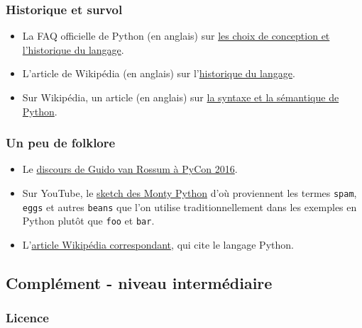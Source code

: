     \hypertarget{historique-et-survol}{%
\subsubsection{Historique et survol}\label{historique-et-survol}}

    \begin{itemize}
\tightlist
\item
  La FAQ officielle de Python (en anglais) sur
  \href{https://docs.python.org/3/faq/design.html}{les choix de
  conception et l'historique du langage}.
\item
  L'article de Wikipédia (en anglais) sur
  l'\href{http://en.wikipedia.org/wiki/History_of_Python}{historique du
  langage}.
\item
  Sur Wikipédia, un article (en anglais) sur
  \href{http://en.wikipedia.org/wiki/Python_syntax_and_semantics}{la
  syntaxe et la sémantique de Python}.
\end{itemize}

    \hypertarget{un-peu-de-folklore}{%
\subsubsection{Un peu de folklore}\label{un-peu-de-folklore}}

    \begin{itemize}
\tightlist
\item
  Le \href{https://www.youtube.com/watch?v=YgtL4S7Hrwo}{discours de
  Guido van Rossum à PyCon 2016}.
\item
  Sur YouTube, le
  \href{https://www.youtube.com/watch?v=anwy2MPT5RE}{sketch des Monty
  Python} d'où proviennent les termes \texttt{spam}, \texttt{eggs} et
  autres \texttt{beans} que l'on utilise traditionnellement dans les
  exemples en Python plutôt que \texttt{foo} et \texttt{bar}.
\item
  L'\href{http://en.wikipedia.org/wiki/Spam_\%28Monty_Python\%29}{article
  Wikipédia correspondant}, qui cite le langage Python.
\end{itemize}

    \hypertarget{compluxe9ment---niveau-intermuxe9diaire}{%
\subsection{Complément - niveau
intermédiaire}\label{compluxe9ment---niveau-intermuxe9diaire}}

    \hypertarget{licence}{%
\subsubsection{Licence}\label{licence}}

